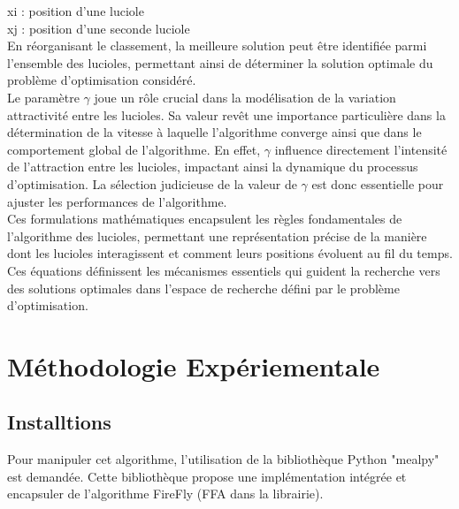 \documentclass[conference]{IEEEtran}
\begin{document}
x{i} : position d'une luciole\\
x{j}  : position d'une seconde luciole \\

 En réorganisant le classement, la meilleure solution peut être identifiée parmi l'ensemble des lucioles, permettant ainsi de déterminer la solution optimale du problème d'optimisation considéré.\\
Le paramètre \(\gamma\) joue un rôle crucial dans la modélisation de la variation attractivité entre les lucioles. Sa valeur revêt une importance particulière dans la détermination de la vitesse à laquelle l'algorithme converge ainsi que dans le comportement global de l'algorithme. En effet, \(\gamma\) influence directement l'intensité de l'attraction entre les lucioles, impactant ainsi la dynamique du processus d'optimisation. La sélection judicieuse de la valeur de \(\gamma\) est donc essentielle pour ajuster les performances de l'algorithme.\cite{b3}\\
Ces formulations mathématiques encapsulent les règles fondamentales de l'algorithme des lucioles, permettant une représentation précise de la manière dont les lucioles interagissent et comment leurs positions évoluent au fil du temps. Ces équations définissent les mécanismes essentiels qui guident la recherche vers des solutions optimales dans l'espace de recherche défini par le problème d'optimisation.



\section{Méthodologie Expériementale}
\subsection{Installtions}


Pour manipuler cet algorithme, l'utilisation de la bibliothèque Python "mealpy" est demandée. Cette bibliothèque propose une implémentation intégrée et encapsuler de l'algorithme FireFly (FFA dans la librairie).
\end{document}
